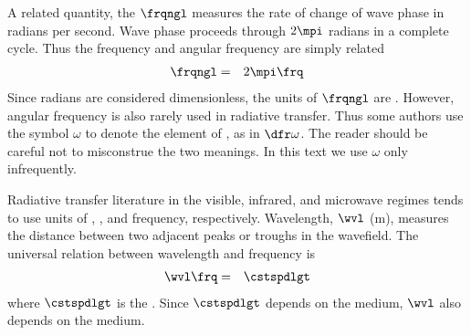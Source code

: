 \documentclass[12pt]{article}
\begin{document}
A related quantity, the  $\frqngl$ 
measures the rate of change of wave phase in radians per second.
Wave phase proceeds through $2\mpi$ radians in a complete cycle.
Thus the frequency and angular frequency are simply related
\begin{eqnarray}
\frqngl & = & 2\mpi \frq
\label{eqn:frq_ngl_dfn}
\end{eqnarray}
Since radians are considered dimensionless, the units of $\frqngl$ are
\xs. 
However, angular frequency is also rarely used in radiative transfer. 
Thus some authors use the symbol $\omega$ to denote the element 
of , as in $\dfr\omega$.
The reader should be careful not to misconstrue the two meanings.
In this text we use $\omega$ only infrequently.

Radiative transfer literature in the visible, infrared, and microwave
regimes tends to use units of ,
, and frequency, respectively.
Wavelength, $\wvl$ (m), measures the distance between two adjacent
peaks or troughs in the wavefield.
The universal relation between wavelength and frequency is
\begin{eqnarray}
\wvl \frq & = & \cstspdlgt
\label{eqn:wvl_dfn}
\end{eqnarray}
where $\cstspdlgt$ is the .
Since $\cstspdlgt$ depends on the medium, $\wvl$ also depends on the
medium. 
\end{document}
